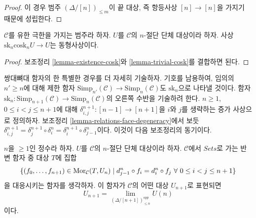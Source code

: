 \begin{proof}
이 경우 범주 $(\Delta/[n])_{\leq m}$이 끝 대상, 즉 항등사상
$[n] \to [n]$을 가지기 때문에 성립한다.
\end{proof}

\begin{lemma}
\label{lemma-recover-cosk}
$\mathcal{C}$를 유한 극한을 가지는 범주라 하자.
$U$를 $\mathcal{C}$의 $n$-절단 단체 대상이라 하자.
사상 $\text{sk}_n \text{cosk}_n U \to U$는 동형사상이다.
\end{lemma}

\begin{proof}
보조정리 \ref{lemma-existence-cosk}와 \ref{lemma-trivial-cosk}를 결합하면
된다.
\end{proof}

\noindent
쌍대뼈대 함자의 한 특별한 경우를 더 자세히 기술하자.
기호를 남용하여, 임의의 $n' \geq n$에 대해 제한 함자
$\text{Simp}_{n'}(\mathcal{C}) \to \text{Simp}_n(\mathcal{C})$도
$\text{sk}_n$으로 나타낼 것이다. 함자
$\text{sk}_n : \text{Simp}_{n + 1}(\mathcal{C})
\to \text{Simp}_n(\mathcal{C})$의 오른쪽 수반을 기술하려 한다.
$n \geq 1$, $0 \leq i < j \leq n + 1$에 대해
$\delta^{n + 1}_{i, j} : [n - 1] \to [n + 1]$을 $i$와 $j$를 생략하는
증가 사상으로 정의하자. 보조정리 \ref{lemma-relations-face-degeneracy}에서
보듯
$\delta^{n + 1}_{i, j} =
\delta^{n + 1}_j \circ \delta^n_i =
\delta^{n + 1}_i \circ \delta^n_{j - 1}$이다.
이것이 다음 보조정리의 동기이다.

\begin{lemma}
\label{lemma-formula-limit}
$n$을 $\geq 1$인 정수라 하자.
$U$를 $\mathcal{C}$의 $n$-절단 단체 대상이라 하자.
$\mathcal{C}$에서 $\textit{Sets}$로 가는 반변 함자 중 대상 $T$에 집합
$$
\{ (f_0, \ldots, f_{n + 1}) \in \mathop{\mathrm{Mor}}\nolimits_\mathcal{C}(T, U_n)
\mid
d^n_{j - 1} \circ f_i = d^n_i \circ f_j
\ \forall\ 0\leq i < j\leq n + 1\}
$$
을 대응시키는 함자를 생각하자.
이 함자가 $\mathcal{C}$의 어떤 대상 $U_{n + 1}$로 표현되면
$$
U_{n + 1} = \lim_{(\Delta/[n + 1])_{\leq n}^{opp}} U(n)
$$
이다.
\end{lemma}

